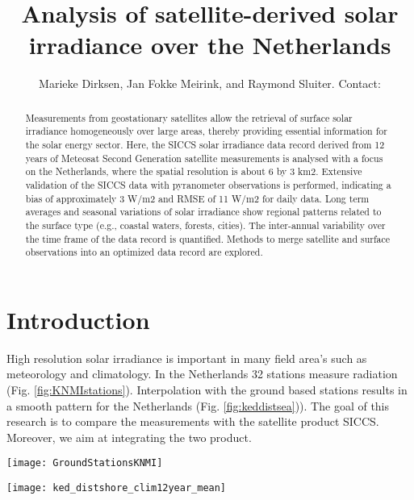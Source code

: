 \documentclass[]{article}
\title{Analysis of satellite-derived solar irradiance over the Netherlands}
\author{Marieke Dirksen\affil{1}, Jan Fokke Meirink\affil{1}, and Raymond Sluiter\affil{1}. Contact: \email{dirksen@knmi.nl}}
\begin{document}
\maketitle

\begin{abstract}
Measurements from geostationary satellites allow the retrieval of surface solar irradiance homogeneously over large areas, thereby providing essential information for the solar energy sector. Here, the SICCS solar irradiance data record derived from 12 years of Meteosat Second Generation satellite measurements is analysed with a focus on the Netherlands, where the spatial resolution is about 6 by 3 km2. Extensive validation of the SICCS data with pyranometer observations is performed, indicating a bias of approximately 3 W/m2 and RMSE of 11 W/m2 for daily data. Long term averages and seasonal variations of solar irradiance show regional patterns related to the surface type (e.g., coastal waters, forests, cities). The inter-annual variability over the time frame of the data record is quantified. Methods to merge satellite and surface observations into an optimized data record are explored. %
\end{abstract}

\bcols %

\section*{Introduction}

High resolution solar irradiance is important in many field area's such as meteorology and climatology. In the Netherlands 32 stations measure radiation (Fig. \ref{fig:KNMIstations}). Interpolation with the ground based stations results in a smooth pattern for the Netherlands (Fig. \ref{fig:keddistsea})). The goal of this research is to compare the measurements with the satellite product SICCS. Moreover, we aim at integrating the two product. 

\vspace{1em}
\begin{minipage}[b]{\columnwidth}
	\begin{center}
		\begin{minipage}[b]{0.45\columnwidth}
			\centering
\texttt{[image: GroundStationsKNMI]}
\label{fig:KNMIstations}
		\end{minipage}
		\hspace{0.5cm}
		\begin{minipage}[b]{0.45\columnwidth}
			\centering
\texttt{[image: ked\_distshore\_clim12year\_mean]}
\label{fig:keddistsea}
		\end{minipage}
	\end{center}
\end{minipage}
\end{document}
